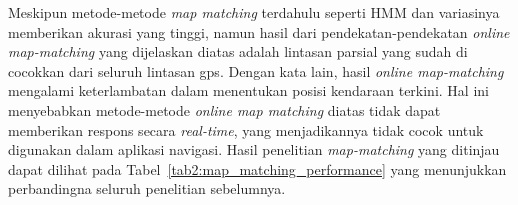 Meskipun metode-metode \textit{map matching} terdahulu seperti HMM dan variasinya memberikan akurasi yang tinggi, namun hasil dari pendekatan-pendekatan \textit{online map-matching} yang dijelaskan diatas adalah lintasan parsial yang sudah di cocokkan dari seluruh lintasan gps. Dengan kata lain, hasil \textit{online map-matching} mengalami keterlambatan dalam menentukan posisi kendaraan terkini. Hal ini menyebabkan metode-metode \textit{ online map matching} diatas tidak dapat memberikan respons secara \textit{real-time}, yang menjadikannya tidak cocok untuk digunakan dalam aplikasi navigasi. Hasil penelitian \textit{map-matching} yang ditinjau dapat dilihat pada Tabel~\ref{tab2:map_matching_performance} yang menunjukkan perbandingna seluruh penelitian sebelumnya.


